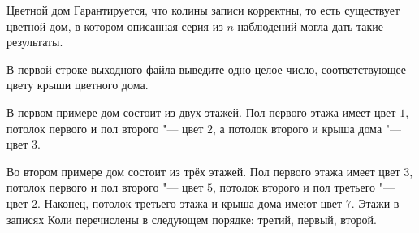 \begin{problem}{Цветной дом}
Гарантируется, что колины записи корректны, то есть существует цветной дом,
в котором описанная серия из $n$ наблюдений могла дать такие результаты.

\OutputFile


В первой строке выходного файла выведите одно целое число,
соответствующее цвету крыши цветного дома.

\Examples



\begin{example}
%
%
\end{example}

\Explanations


В первом примере дом состоит из двух этажей.
Пол первого этажа имеет цвет $1$, потолок первого и пол второго "--- цвет $2$,
а потолок второго и крыша дома "--- цвет $3$.

Во втором примере дом состоит из трёх этажей.
Пол первого этажа имеет цвет $3$, потолок первого и пол второго "--- цвет $5$,
потолок второго и пол третьего "--- цвет $2$.
Наконец, потолок третьего этажа и крыша дома имеют цвет $7$.
Этажи в записях Коли перечислены в следующем порядке:
третий, первый, второй.

%
%

\end{problem}
